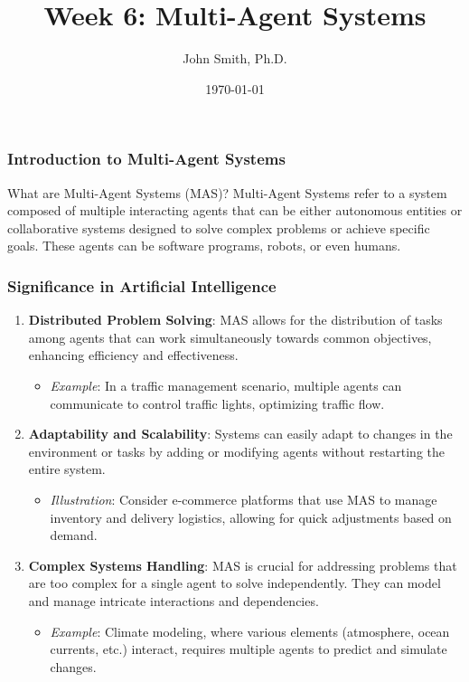 \documentclass[aspectratio=169]{beamer}
\title[Week 6: Multi-Agent Systems]{Week 6: Multi-Agent Systems}
\author[J. Smith]{John Smith, Ph.D.}
\institute[University Name]{
  Department of Computer Science\\
  University Name\\
  Email: email@university.edu\\
  Website: www.university.edu
}
\date{\today}
\begin{document}
\frame{\titlepage}

\begin{frame}[fragile]
    \frametitle{Introduction to Multi-Agent Systems}
    \begin{block}{What are Multi-Agent Systems (MAS)?}
        Multi-Agent Systems refer to a system composed of multiple interacting agents that can be either autonomous entities or collaborative systems designed to solve complex problems or achieve specific goals. 
        These agents can be software programs, robots, or even humans.
    \end{block}
\end{frame}

\begin{frame}[fragile]
    \frametitle{Significance in Artificial Intelligence}
    \begin{enumerate}
        \item \textbf{Distributed Problem Solving}: 
        MAS allows for the distribution of tasks among agents that can work simultaneously towards common objectives, enhancing efficiency and effectiveness.
        \begin{itemize}
            \item \textit{Example}: In a traffic management scenario, multiple agents can communicate to control traffic lights, optimizing traffic flow.
        \end{itemize}
        
        \item \textbf{Adaptability and Scalability}: 
        Systems can easily adapt to changes in the environment or tasks by adding or modifying agents without restarting the entire system.
        \begin{itemize}
            \item \textit{Illustration}: Consider e-commerce platforms that use MAS to manage inventory and delivery logistics, allowing for quick adjustments based on demand.
        \end{itemize}
        
        \item \textbf{Complex Systems Handling}: 
        MAS is crucial for addressing problems that are too complex for a single agent to solve independently. They can model and manage intricate interactions and dependencies.
        \begin{itemize}
            \item \textit{Example}: Climate modeling, where various elements (atmosphere, ocean currents, etc.) interact, requires multiple agents to predict and simulate changes.
        \end{itemize}
    \end{enumerate}
\end{frame}
\end{document}
